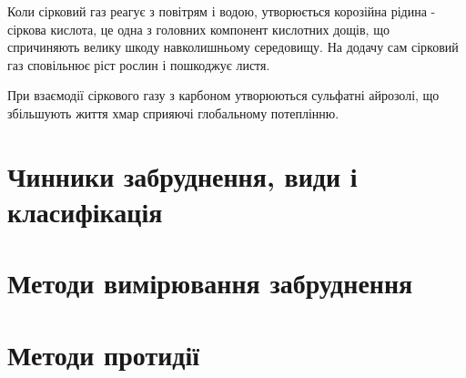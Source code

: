 Коли сірковий газ реагує з повітрям і водою, утворюється корозійна рідина - 
сіркова кислота, це одна з головних компонент кислотних дощів, що 
спричиняють велику шкоду навколишньому середовищу. На додачу сам сірковий 
газ сповільнює ріст рослин і пошкоджує листя. 


При взаємодії сіркового газу з карбоном утворюються сульфатні айрозолі, що 
збільшують життя хмар сприяючі глобальному потеплінню.



\section{Чинники забруднення, види і класифікація}



\section{Методи вимірювання забруднення}

\section{Методи протидії}
